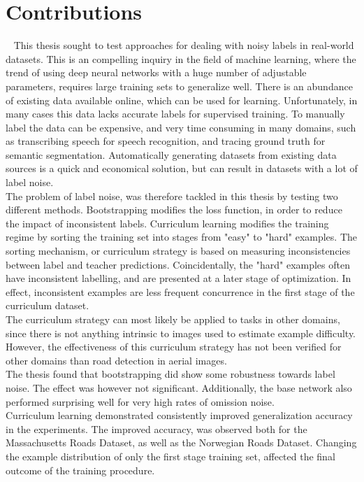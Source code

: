 \section{Contributions}~\label{cont}
\label{sec:Contributions}
This thesis sought to test approaches for dealing with noisy labels in real-world datasets. This is an compelling inquiry in the field of machine learning, where the trend of using deep neural networks with a huge number of adjustable parameters, requires large training sets to generalize well. There is an abundance of existing data available online, which can be used for learning. Unfortunately, in many cases this data lacks accurate labels for supervised training. To manually label the data can be expensive, and very time consuming in many domains, such as transcribing speech for speech recognition, and tracing ground truth for semantic segmentation. Automatically generating datasets from existing data sources is a quick and economical solution, but can result in datasets with a lot of label noise.\\

The problem of label noise, was therefore tackled in this thesis by testing two different methods. Bootstrapping modifies the loss function, in order to reduce the impact of inconsistent labels. Curriculum learning modifies the training regime by sorting the training set into stages from "easy" to "hard" examples. The sorting mechanism, or curriculum strategy is based on measuring inconsistencies between label and teacher predictions. Coincidentally, the "hard" examples often have inconsistent labelling, and are presented at a later stage of optimization. In effect, inconsistent examples are less frequent concurrence in the first stage of the curriculum dataset.\\
 
The curriculum strategy can most likely be applied to tasks in other domains, since there is not anything intrinsic to images used to estimate example difficulty. However, the effectiveness of this curriculum strategy has not been verified for other domains than road detection in aerial images.\\

The thesis found that bootstrapping did show some robustness towards label noise. The effect was however not significant. Additionally, the base network also performed surprising well for very high rates of omission noise.\\

Curriculum learning demonstrated consistently improved generalization accuracy in the experiments. The improved accuracy, was observed both for the Massachusetts Roads Dataset, as well as the Norwegian Roads Dataset. Changing the example distribution of only the first stage training set, affected the final outcome of the training procedure.\\

